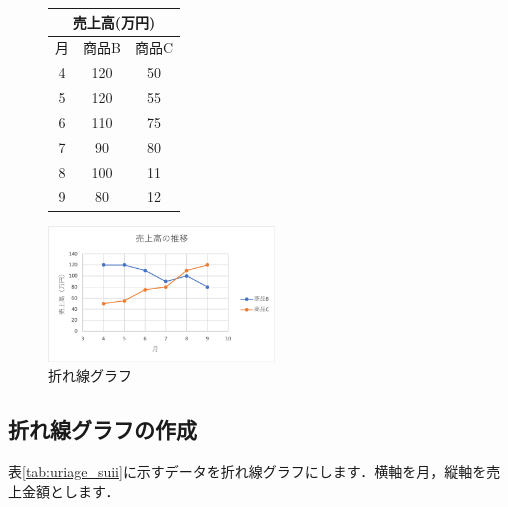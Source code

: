 \begin{figure}[htbp]
    \begin{minipage}{0.5\hsize}
        \centering
        \makeatletter
        \def\@captype{table}
        \makeatother
        \caption{}
        \begin{tabular}{|c|c|c|}
          \hline
          \multicolumn{3}{|c|}{売上高(万円)}\\ \hline
          月& 商品B & 商品C \\ \hline
          4 &  120 & 50\\ \hline
          5 &  120 & 55\\ \hline
          6 &  110 & 75\\ \hline
          7 &  90  & 80\\ \hline
          8 &  100 & 11\\ \hline
          9 &  80  & 12\\ \hline
        \end{tabular}
        \label{tab:uriage_suii}
    \end{minipage}
    \begin{minipage}{0.5\hsize}
        \centering
        \includegraphics[width=6cm]{chap2/line.png}
        \caption{折れ線グラフ}
        \label{fig:line}
    \end{minipage}
\end{figure}

\subsection{折れ線グラフの作成}

表\ref{tab:uriage_suii}に示すデータを折れ線グラフにします．横軸を月，縦軸を売上金額とします．

